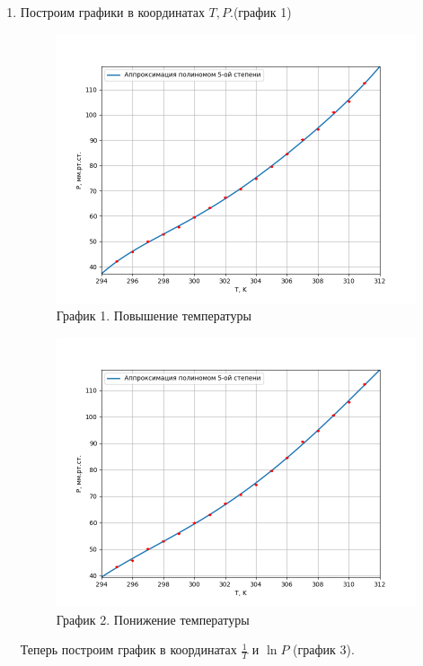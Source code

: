 \documentclass[a4paper,12pt]{article} %
\begin{document}
\begin{enumerate}
	\newpage
	\item Построим графики в координатах $T, P$.(график 1)
	\begin{figure}[h!]
		\centering
		\includegraphics[scale = 0.8]{Pictures/График 1.png}
		\caption*{График 1. Повышение температуры}
	\end{figure}
	\newpage
	\begin{figure}[h!]
		\centering
		\includegraphics[scale = 0.8]{Pictures/График 2.png}
		\caption*{График 2. Понижение температуры}
	\end{figure}
	\vspace{15mm}

	Теперь построим график в координатах $\frac{1}{T}$ и $\ln{P}$ (график 3).
	

\end{enumerate}
\end{document}
